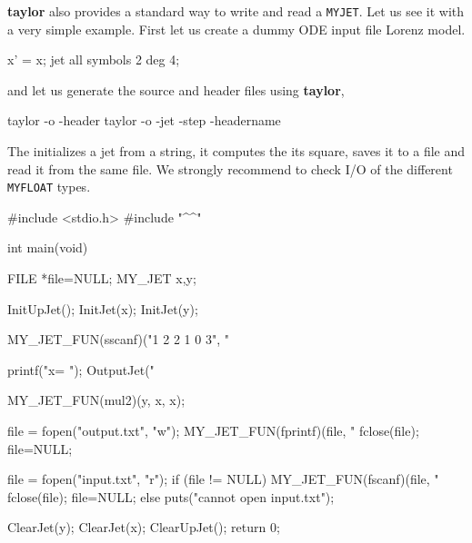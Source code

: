 \documentclass[10pt]{article}
\theoremstyle{remark}
\newcommand{\taylorname}{{\bf taylor}}
\newcommand{\myfloat}{{\tt MY\symbol{95}FLOAT}}
\newcommand{\myjet}{{\tt MY\symbol{95}JET}}
\newcommand{\inputfile}{}
\newcommand{\mainfile}{}
\newcommand{\odecfile}{}
\newcommand{\odehfile}{}
\begin{document}
\taylorname{} also provides a standard way to write and read a
\myjet{}. Let us see it with a very simple example. First let us
create a dummy ODE input file \inputfile{} Lorenz model.
\begin{code}[title={File: \inputfile{}}]
    x' = x;    
    jet all symbols 2 deg 4;
\end{code}
and let us generate the source and header files using \taylorname{},
\begin{command}
    taylor -o \odehfile{} -header \inputfile{}
    taylor -o \odecfile{} -jet -step -headername \odehfile{} \inputfile{}
\end{command}
The \mainfile{} initializes a jet from a string, it computes the its
square, saves it to a file and read it from the same file. We strongly
recommend to check I/O of the different \myfloat{} types.
\begin{code}[title={File: \mainfile{}}]
    #include <stdio.h>
    #include "^\odehfile{}^"

    int main(void)
    {
      FILE *file=NULL;
      MY_JET x,y;
      
      InitUpJet();
      InitJet(x); InitJet(y); 
      
      MY_JET_FUN(sscanf)("1 2 2 1 0 3", "%
      
      printf("x= "); OutputJet("%
      
      MY_JET_FUN(mul2)(y, x, x);
      
      file = fopen("output.txt", "w");   
      MY_JET_FUN(fprintf)(file, "%
      fclose(file); file=NULL;
      
      file = fopen("input.txt", "r");
      if (file != NULL)
        {
          MY_JET_FUN(fscanf)(file, "%
          fclose(file); file=NULL;
        }
        else
        {
          puts("cannot open input.txt");
        }
        
      ClearJet(y); ClearJet(x); 
      ClearUpJet();
      return 0;
    }
\end{code}
\end{document}
